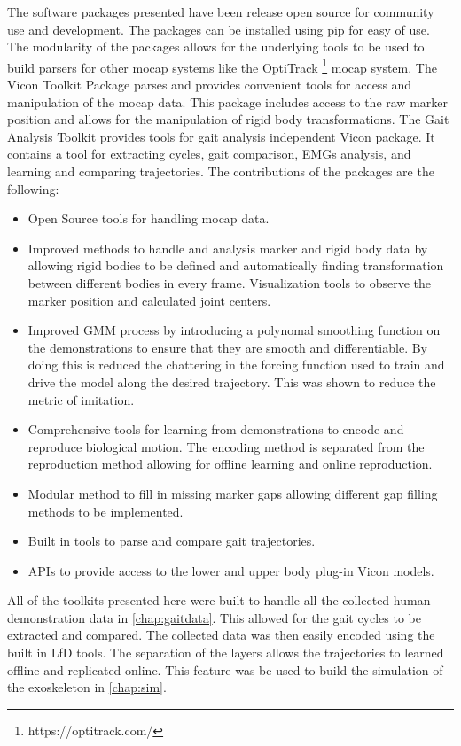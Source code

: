 The software packages presented have been release open source for community use and development. The packages can be installed using pip for easy of use. The modularity of the packages allows for the underlying tools to be used to build parsers for other mocap systems like the OptiTrack \footnote{https://optitrack.com/} mocap system. The Vicon Toolkit Package parses and provides convenient tools for access and manipulation of the mocap data. This package includes access to the raw marker position and allows for the manipulation of rigid body transformations. The Gait Analysis Toolkit provides tools for gait analysis independent Vicon package.  It contains a tool for extracting cycles, gait comparison, EMGs analysis, and learning and comparing trajectories. The contributions of the packages are the following:

\begin{itemize}
    \item Open Source tools for handling mocap data.
    \item Improved methods to handle and analysis marker and rigid body data by allowing rigid bodies to be defined and automatically finding transformation between different bodies in every frame.
    \iten Visualization tools to observe the marker position and calculated joint centers. 
    \item Improved GMM process by introducing a polynomal smoothing function on the demonstrations to ensure that they are smooth and differentiable. By doing this is reduced the chattering in the forcing function used to train and drive the model along the desired trajectory. This was shown to reduce the metric of imitation.
    \item Comprehensive tools for learning from demonstrations to encode and reproduce biological motion. The encoding method is separated from the reproduction method allowing for offline learning and online reproduction.
    \item Modular method to fill in missing marker gaps allowing different gap filling methods to be implemented. 
    \item Built in tools to parse and compare gait trajectories. 
    \item APIs to provide access to the lower and upper body plug-in Vicon models. 
\end{itemize}

All of the toolkits presented here were built to handle all the collected human demonstration data in \autoref{chap:gaitdata}. This allowed for the gait cycles to be extracted and compared. The collected data was then easily encoded using the built in LfD tools. The separation of the layers allows the trajectories to learned offline and replicated online. This feature was be used to build the simulation of the exoskeleton in \autoref{chap:sim}.

